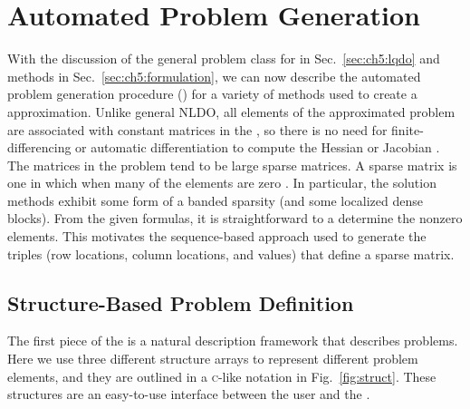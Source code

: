 \section{Automated Problem Generation} \label{sec:ch5:algorithm}

With the discussion of the general problem class for \lqdo{} in Sec.~\ref{sec:ch5:lqdo} and \dt{} methods in Sec.~\ref{sec:ch5:formulation}, we can now describe the automated problem generation procedure (\apgp) for a variety of \dt{} methods used to create a \qp{} approximation.
Unlike general NLDO, all elements of the approximated \lqdo{} problem are associated with constant matrices in the \qp{}, so there is no need for finite-differencing or automatic differentiation to compute the Hessian or Jacobian \cite{Rao2010a}.
The matrices in the \qp{} problem tend to be large sparse matrices.
A sparse matrix is one in which when many of the elements are zero \cite{Betts2010a}.
In particular, the solution methods exhibit some form of a banded sparsity (and some localized dense blocks).
From the given formulas, it is straightforward to a determine the nonzero elements.
This motivates the sequence-based approach used to generate the triples (row locations, column locations, and values) that define a sparse matrix.

\subsection{Structure-Based Problem Definition}

The first piece of the \apgp{} is a natural description framework that describes \lqdo{} problems.
Here we use three different structure arrays to represent different problem elements, and they are outlined in a \textsc{c}-like notation in Fig.~\ref{fig:struct}. 
These structures are an easy-to-use interface between the user and the \apgp.



